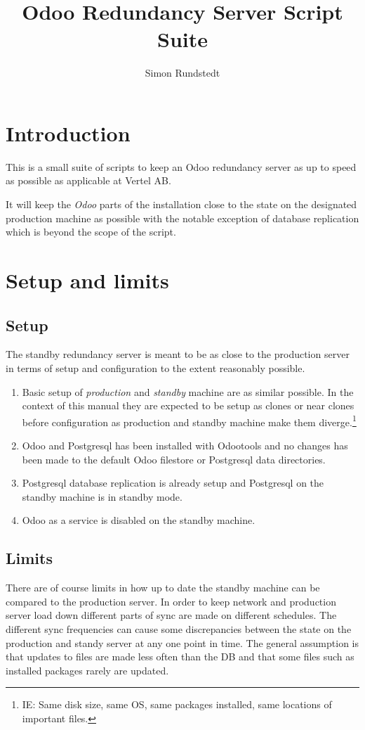 \documentclass[a4paper]{article}
\title{Odoo Redundancy Server Script Suite}
\author{Simon Rundstedt}
\begin{document}
	\maketitle
	\tableofcontents
	\newpage
	
\section{Introduction}
	This is a small suite of scripts to keep an Odoo redundancy server as up to speed as possible as applicable at Vertel AB.
	
	It will keep the \emph{Odoo} parts of the installation close to the state on the designated production machine as possible with the notable exception of database replication which is beyond the scope of the script.

\section{Setup and limits}
\subsection{Setup}
\label{sec:setup}
	The standby redundancy server is meant to be as close to the production server in terms of setup and configuration to the extent reasonably possible.
	\begin{enumerate}
		\item Basic setup of \emph{production} and \emph{standby} machine are as similar possible. In the context of this manual they are expected to be setup as clones or near clones before configuration as production and standby machine make them diverge.\footnote{IE: Same disk size, same OS, same packages installed, same locations of important files.}
		\item Odoo and Postgresql has been installed with Odootools and no changes has been made to the default Odoo filestore or Postgresql data directories.
		\item Postgresql database replication is already setup and Postgresql on the standby machine is in standby mode.
		\item Odoo as a service is disabled on the standby machine.
	\end{enumerate}

\subsection{Limits}
	There are of course limits in how up to date the standby machine can be compared to the production server. In order to keep network and production server load down different parts of sync are made on different schedules. The different sync frequencies can cause some discrepancies between the state on the production and standy server at any one point in time.
	The general assumption is that updates to files are made less often than the DB and that some files such as installed packages rarely are updated.	
	
\end{document}
